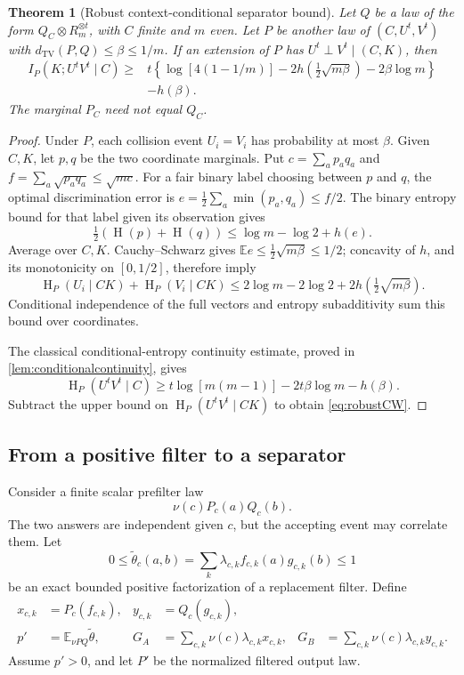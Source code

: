 \documentclass[11pt,reqno]{amsart}
\numberwithin{equation}{section}
\newtheorem{theorem}{Theorem}[section]
\theoremstyle{definition}
\theoremstyle{remark}
\newcommand{\E}{\mathbb E}
\newcommand{\TV}{d_{\mathrm{TV}}}
\DeclareMathOperator{\Ent}{H}
\begin{document}
\begin{theorem}[Robust context-conditional separator bound]\label{thm:robustCW}
Let \(Q\) be a law of the form \(Q_C\otimes R_m^{\otimes t}\), with \(C\) finite and \(m\) even. Let \(P\) be another law of \((C,U^t,V^t)\) with
\(\TV(P,Q)\le\beta\le1/m\). If an extension of \(P\) has
\(U^t\perp V^t\mid(C,K)\), then
\begin{equation}\label{eq:robustCW}
\begin{split}
 I_P(K;U^tV^t\mid C)\ge{}&
 t\left\{\log[4(1-1/m)]
 -2h\left(\tfrac12\sqrt{m\beta}\right)
 -2\beta\log m\right\}\\
 &-h(\beta).
\end{split}
\end{equation}
The marginal \(P_C\) need not equal \(Q_C\).
\end{theorem}
\begin{proof}
Under \(P\), each collision event \(U_i=V_i\) has probability at most \(\beta\). Given \(C,K\), let \(p,q\) be the two coordinate marginals. Put
\(c=\sum_ap_aq_a\) and \(f=\sum_a\sqrt{p_aq_a}\le\sqrt{mc}\).
For a fair binary label choosing between \(p\) and \(q\), the optimal discrimination error is
\(e=\tfrac12\sum_a\min(p_a,q_a)\le f/2\).
The binary entropy bound for that label given its observation gives
\[
 \tfrac12(\Ent(p)+\Ent(q))
 \le\log m-\log2+h(e).
\]
Average over \(C,K\). Cauchy--Schwarz gives
\(\E e\le\tfrac12\sqrt{m\beta}\le1/2\);
concavity of \(h\), and its monotonicity on \([0,1/2]\), therefore imply
\[
 \Ent_P(U_i\mid CK)+\Ent_P(V_i\mid CK)
 \le2\log m-2\log2+
          2h\left(\tfrac12\sqrt{m\beta}\right).
\]
Conditional independence of the full vectors and entropy subadditivity sum this bound over coordinates.

The classical conditional-entropy continuity estimate, proved in \cref{lem:conditionalcontinuity}, gives
\[
 \Ent_P(U^tV^t\mid C)
 \ge t\log[m(m-1)]-2t\beta\log m-h(\beta).
\]
Subtract the upper bound on \(\Ent_P(U^tV^t\mid CK)\) to obtain \eqref{eq:robustCW}.
\end{proof}

\subsection{From a positive filter to a separator}
Consider a finite scalar prefilter law
\[
 \nu(c)P_c(a)Q_c(b).
\]
The two answers are independent given \(c\), but the accepting event may correlate them. Let
\[
 0\le\widetilde\theta_c(a,b)
 =\sum_k\lambda_{c,k}f_{c,k}(a)g_{c,k}(b)\le1
\]
be an exact bounded positive factorization of a replacement filter. Define
\begin{align*}
 x_{c,k}&=P_c(f_{c,k}),& y_{c,k}&=Q_c(g_{c,k}),\\
 p'&=\E_{\nu P Q}\widetilde\theta,&
 G_A&=\sum_{c,k}\nu(c)\lambda_{c,k}x_{c,k},&
 G_B&=\sum_{c,k}\nu(c)\lambda_{c,k}y_{c,k}.
\end{align*}
Assume \(p'>0\), and let \(P'\) be the normalized filtered output law.
\end{document}
